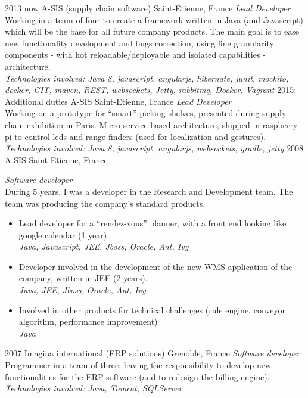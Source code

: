 \documentclass[]{k-cv} %
\begin{document}
\begin{entrylist}
\entry
{2013 \to now}
{A-SIS (supply chain software)}
{Saint-Etienne, France}
{\emph{Lead Developer} \\
Working in a team of four to create a framework written in Java (and Javascript) which
 will be the base for all future company products.
The main goal is to ease new functionality development and bugs correction,
  using fine granularity components - with hot reloadable/deployable and isolated capabilities - architecture. \\
\emph{
Technologies involved:
Java 8, javascript, angularjs, hibernate, junit, mockito, docker,
GIT, maven, REST, websockets, Jetty, rabbitmq, Docker, Vagrant
}}
\entry
{2015: Additional duties}
{A-SIS}
{Saint-Etienne, France}
{\emph{Lead Developer} \\
Working on a prototype for ``smart'' picking shelves, presented during supply-chain exhibition in Paris.
Micro-service based architecture, shipped in raspberry pi to control leds and range finders
(used for localization and gestures). \\
\emph{
Technologies involved:
Java 8, javascript, angularjs, websockets,  gradle, jetty
}}
\entry
{2008 }
{A-SIS}
{Saint-Etienne, France}
{\emph{Software developer} \\
During 5 years, I was a developer in the Research and Development team.
The team was producing the company’s standard products.
\begin{itemize}
\item
Lead developer for a ``rendez-vous'' planner, with a front end looking like google calendar (1 year). \\
\emph{Java, Javascript, JEE, Jboss, Oracle, Ant, Ivy}
\item
Developer involved in the development of the new WMS application of the company, written in JEE (2 years). \\
\emph{Java, JEE, Jboss, Oracle, Ant, Ivy}
\item
Involved in other products for technical challenges (rule engine, conveyor algorithm, performance improvement) \\
\emph{Java}
\end{itemize}}
\entry
{2007 }
{Imagina international (ERP solutions)}
{Grenoble, France}
{\emph{Software developer} \\
Programmer in a team of three, having the responsibility to develop
new functionalities for the ERP software (and to redesign the billing engine). \\
\emph{
Technologies involved:
Java, Tomcat, SQLServer
}}
\end{entrylist}
\end{document}
